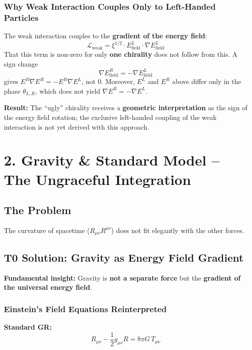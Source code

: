 	\subsubsection*{Why Weak Interaction Couples Only to Left-Handed Particles}
	
	The weak interaction couples to the \textbf{gradient of the energy field}:
	\[
	\mathcal{L}_{\text{weak}} = \xi^{1/2} \cdot E_{\text{field}}^L \cdot \nabla E_{\text{field}}^L
	\]
	That this term is non-zero for only \textbf{one chirality} does not follow from this. A sign change
	\[
	\nabla E_{\text{field}}^R = -\nabla E_{\text{field}}^L
	\]
	gives $E^R\nabla E^R = -E^R\nabla E^L$, not $0$. Moreover, $E^L$ and $E^R$ above differ only in the phase $\theta_{L,R}$, which does not yield $\nabla E^R = -\nabla E^L$.
	
	\textbf{Result:} The ``ugly'' chirality receives a \textbf{geometric interpretation} as the sign of the energy field rotation; the exclusive left-handed coupling of the weak interaction is not yet derived with this approach.
	
	
	
	\section*{2. Gravity \& Standard Model – The Ungraceful Integration}
	
	\subsection*{The Problem}
	The curvature of spacetime ($R_{\mu\nu} R^{\mu\nu}$) does not fit elegantly with the other forces.
	
	\subsection*{T0 Solution: Gravity as Energy Field Gradient}
	
	\textbf{Fundamental insight:} Gravity is \textbf{not a separate force} but the \textbf{gradient of the universal energy field}.
	
	\subsubsection*{Einstein's Field Equations Reinterpreted}
	
	\textbf{Standard GR:}
	\[
	R_{\mu\nu} - \frac{1}{2}g_{\mu\nu}R = 8\pi G \, T_{\mu\nu}
	\]
	
